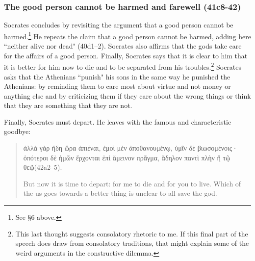 \documentclass[11pt]{article}
\begin{document}

\subsubsection{The good person cannot be harmed and farewell (41c8-42)}

Socrates concludes by revisiting the argument that a good person cannot be
harmed.\footnote{See \S6 above.}  He repeats the claim that a good person
cannot be harmed, adding here ``neither alive nor dead" (40d1--2).  Socrates
also affirms that the gods take care for the affairs of a good person.
Finally, Socrates says that it is clear to him that it is better for him now to
die and to be separated from his troubles.\footnote{This last thought suggests
consolatory rhetoric to me.  If this final part of the speech does draw from
consolatory traditions, that might explain some of the weird arguments in the
constructive dilemma.}  Socrates asks that the Athenians ``punish" his sons in
the same way he punished the Athenians: by reminding them to care most about
virtue and not money or anything else and by criticizing them if they care
about the wrong things or think that they are something that they are not.

Finally, Socrates must depart.  He leaves with the famous and characteristic
goodbye:

\begin{quote}
    {\g ἀλλὰ γὰρ ἤδη ὥρα ἀπιέναι, ἐμοὶ μὲν ἀποθανουμένῳ, ὑμῖν δὲ βιωσομένοις·
    ὁπότεροι δὲ ἡμῶν ἔρχονται ἐπὶ ἄμεινον πρᾶγμα, ἄδηλον παντὶ πλὴν ἢ τῷ
    θεῷ}(42a2--5).

    But now it is time to depart: for me to die and for you to live. Which of
    the us goes towards a better thing is unclear to all save the god.
\end{quote}




\newpage


\end{document}
